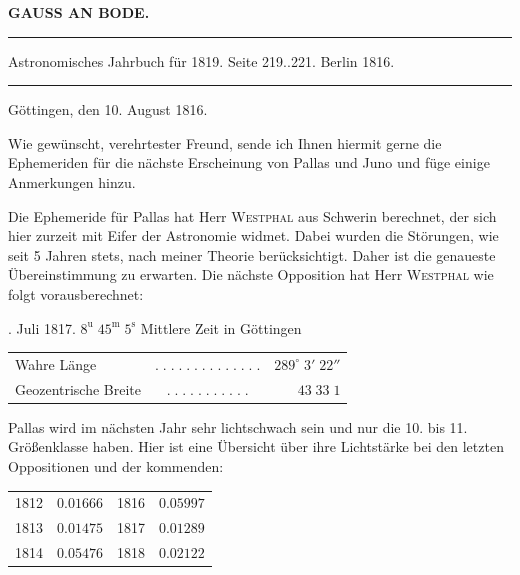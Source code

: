 \clearpage{}
\begin{center}\textbf{GAUSS AN BODE.}\par\vspace{4pt}\hrule\vspace{4pt}\fontsize{10}{12}\selectfont Astronomisches Jahrbuch für 1819. Seite 219..221. Berlin 1816.\par\vspace{4pt}\hrule\vspace{4pt}\end{center}
\begin{flushright}Göttingen, den 10. August 1816.\end{flushright}

\par\indent Wie gewünscht, verehrtester Freund, sende ich Ihnen hiermit gerne die Ephemeriden für die nächste Erscheinung von Pallas und Juno und füge einige Anmerkungen hinzu.

\par\indent Die Ephemeride für Pallas hat Herr \textsc{Westphal} aus Schwerin berechnet, der sich hier zurzeit mit Eifer der Astronomie widmet. Dabei wurden die Störungen, wie seit 5 Jahren stets, nach meiner Theorie berücksichtigt. Daher ist die genaueste Übereinstimmung zu erwarten. Die nächste Opposition hat Herr \textsc{Westphal} wie folgt vorausberechnet:
\begin{center}\fontsize{10}{12}. Juli 1817. $8^{\mathrm u}\;45^{\mathrm m}\;5^{\mathrm s}$ Mittlere Zeit in Göttingen\par
\setlength{\tabcolsep}{3pt}\begin{tabular}{lcr}
Wahre Länge & $.\;.\;.\;.\;.\;.\;.\;.\;.\;.\;.\;.\;.\;.$ & $289^\circ\;3'\;22''$\\
Geozentrische Breite & $.\;.\;.\;.\;.\;.\;.\;.\;.\;.\;.$ & $43\;33\;1$\\
\end{tabular}\end{center}

\par\indent Pallas wird im nächsten Jahr sehr lichtschwach sein und nur die 10. bis 11. Größenklasse haben. Hier ist eine Übersicht über ihre Lichtstärke bei den letzten Oppositionen und der kommenden:
\begin{center}\fontsize{10}{12}\selectfont\setlength{\tabcolsep}{11pt}\begin{tabular}{lr|lr}
1812 & $0.01666$ & 1816 & $0.05997$\\
1813 & $0.01475$ & 1817 & $0.01289$\\
1814 & $0.05476$ & 1818 & $0.02122$\\
\end{tabular}\end{center}

